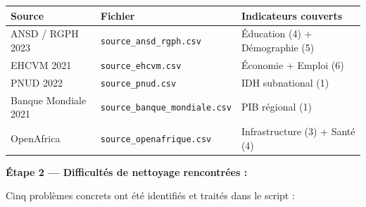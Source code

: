 \documentclass[
]{article}
\newcounter{none} %
\begin{document}
{\def\LTcaptype{none} %
\begin{longtable}[]{@{}
  >{\raggedright\arraybackslash}p{}
  >{\raggedright\arraybackslash}p{}
  >{\raggedright\arraybackslash}p{}@{}}
\toprule\noalign{}
\begin{minipage}[b]{\linewidth}\raggedright
Source
\end{minipage} & \begin{minipage}[b]{\linewidth}\raggedright
Fichier
\end{minipage} & \begin{minipage}[b]{\linewidth}\raggedright
Indicateurs couverts
\end{minipage} \\
\midrule\noalign{}
\endhead
\bottomrule\noalign{}
\endlastfoot
ANSD / RGPH 2023 & \texttt{source\_ansd\_rgph.csv} & Éducation (4) +
Démographie (5) \\
EHCVM 2021 & \texttt{source\_ehcvm.csv} & Économie + Emploi (6) \\
PNUD 2022 & \texttt{source\_pnud.csv} & IDH subnational (1) \\
Banque Mondiale 2021 & \texttt{source\_banque\_mondiale.csv} & PIB
régional (1) \\
OpenAfrica & \texttt{source\_openafrique.csv} & Infrastructure (3) +
Santé (4) \\
\end{longtable}
}

\textbf{Étape 2 --- Difficultés de nettoyage rencontrées :}

Cinq problèmes concrets ont été identifiés et traités dans le script :
\end{document}
